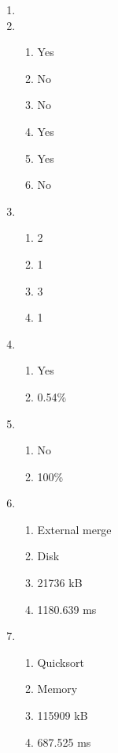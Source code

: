 \documentclass{homework}
\begin{document}
\begin{enumerate}
    \item {}
    
    \item \begin{enumerate}
        \item Yes
        \item No
        \item No
        \item Yes
        \item Yes
        \item No
    \end{enumerate}

    \item \begin{enumerate}
        \item 2
        \item 1
        \item 3
        \item 1
    \end{enumerate}

    \item \begin{enumerate}
        \item Yes
        \item 0.54\%
    \end{enumerate}

    \item \begin{enumerate}
        \item No
        \item 100\%
    \end{enumerate}

    \item \begin{enumerate}
        \item External merge
        \item Disk
        \item 21736 kB
        \item 1180.639 ms
    \end{enumerate}

    \item \begin{enumerate}
        \item Quicksort
        \item Memory
        \item 115909 kB
        \item 687.525 ms
    \end{enumerate}
\end{enumerate}
\end{document}
